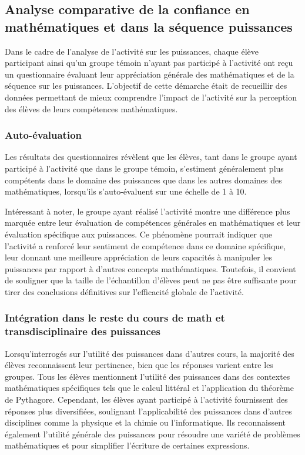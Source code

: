 \subsection{Analyse comparative de la confiance en mathématiques et dans la séquence puissances}

Dans le cadre de l'analyse de l'activité sur les puissances,
chaque élève participant ainsi qu'un groupe témoin n'ayant pas participé à l'activité ont reçu un questionnaire  évaluant leur appréciation générale des mathématiques et de la séquence sur les puissances.
L'objectif de cette démarche était de recueillir des données permettant de mieux comprendre l'impact de l'activité sur la perception des élèves de leurs compétences mathématiques.\\

\subsubsection{Auto-évaluation}

Les résultats des questionnaires révèlent que les élèves,
tant dans le groupe ayant participé à l'activité que dans le groupe témoin,
s'estiment généralement plus compétents dans le domaine des puissances que dans les autres domaines des mathématiques,
lorsqu'ils s'auto-évaluent sur une échelle de 1 à 10.\\


Intéressant à noter,
le groupe ayant réalisé l'activité montre une différence plus marquée entre leur évaluation de compétences générales en mathématiques et leur évaluation spécifique aux puissances.
Ce phénomène pourrait indiquer que l'activité a renforcé leur sentiment de compétence dans ce domaine spécifique,
leur donnant une meilleure appréciation de leurs capacités à manipuler les puissances par rapport à d'autres concepts mathématiques.
Toutefois,
il convient de souligner que la taille de l'échantillon d'élèves peut ne pas être suffisante pour tirer des conclusions définitives sur l'efficacité globale de l'activité.

\subsubsection{Intégration dans le reste du cours de math et transdisciplinaire des puissances}

Lorsqu'interrogés sur l'utilité des puissances dans d'autres cours,
la majorité des élèves reconnaissent leur pertinence,
bien que les réponses varient entre les groupes.
Tous les élèves mentionnent l'utilité des puissances dans des contextes mathématiques spécifiques tels que le calcul littéral et l'application du théorème de Pythagore.
Cependant,
les élèves ayant participé à l'activité fournissent des réponses plus diversifiées,
soulignant l'applicabilité des puissances dans d'autres disciplines comme la physique et la chimie ou l'informatique.
Ils reconnaissent également l'utilité générale des puissances pour résoudre une variété de problèmes mathématiques et pour simplifier l'écriture de certaines expressions.

